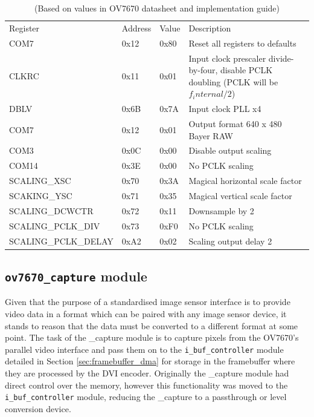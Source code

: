 \begin{table}
    \begin{tabular}{llll}
    Register            & Address   & Value     & Description                       \\
    COM7                & 0x12      & 0x80      & Reset all registers to defaults   \\
    CLKRC               & 0x11      & 0x01      & Input clock prescaler divide-by-four, disable PCLK doubling (PCLK will be \(f_internal / 2\)) \\
    DBLV                & 0x6B      & 0x7A      & Input clock PLL x4                \\
    COM7                & 0x12      & 0x01      & Output format 640 x 480 Bayer RAW \\
    COM3                & 0x0C      & 0x00      & Disable output scaling            \\
    COM14               & 0x3E      & 0x00      & No PCLK scaling                   \\
    SCALING_XSC         & 0x70      & 0x3A      & Magical horizontal scale factor   \\
    SCAKING_YSC         & 0x71      & 0x35      & Magical vertical scale factor     \\
    SCALING_DCWCTR      & 0x72      & 0x11      & Downsample by 2           \\
    SCALING_PCLK_DIV    & 0x73      & 0xF0      & No PCLK scaling           \\
    SCALING_PCLK_DELAY  & 0xA2      & 0x02      & Scaling output delay 2    \\
    \end{tabular}
    \caption{(Based on values in OV7670 datasheet and implementation guide)}
    \label{table:ov7670_register_settings}
\end{table}

\subsection{\texttt{ov7670\_capture} module}
Given that the purpose of a standardised image sensor interface is to provide video data in a format which can be paired with any image sensor device, it stands to reason that the data must be converted to a different format at some point. The task of the _capture module is to capture pixels from the OV7670's parallel video interface and pass them on to the \texttt{i\_buf\_controller} module detailed in Section \ref{sec:framebuffer_dma} for storage in the framebuffer where they are processed by the DVI encoder. Originally the _capture module had direct control over the memory, however this functionality was moved to the \texttt{i\_buf\_controller} module, reducing the _capture to a passthrough or level conversion device.


